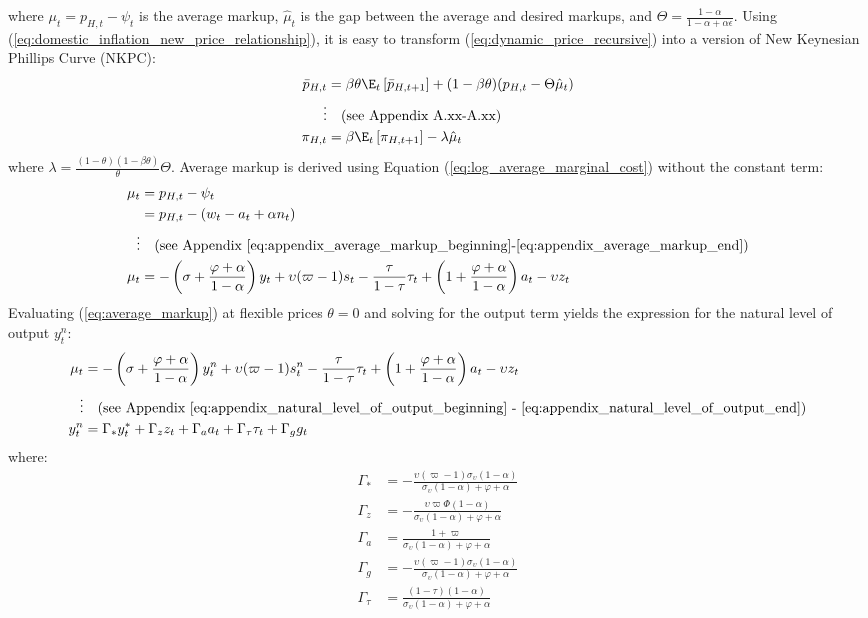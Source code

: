 where $\mu_t = p_{H,t} - \psi_t$ is the average markup, $\hat{\mu}_t$ is the gap between the average and desired markups, and $\Theta = \frac{1-\alpha}{1-\alpha + \alpha \epsilon}$. Using (\ref{eq:domestic_inflation_new_price_relationship}), it is easy to transform (\ref{eq:dynamic_price_recursive}) into a version of New Keynesian Phillips Curve (NKPC):
\begin{align}
    \bar{p}_{H,t} &= \beta \theta \E_t \left[ \bar{p}_{H,t+1} \right] + (1-\beta \theta)(p_{H,t} - \Theta \hat{\mu}_t) \\
    \vdots & \quad \text{(see Appendix A.xx-A.xx)} \nonumber \\
    \pi_{H,t} &= \beta \E_t \left[ \pi_{H,t+1}\right] - \lambda \hat{\mu}_t \label{eq:nkpc_a_version}
\end{align}
where $\lambda = \frac{(1-\theta)(1-\beta \theta)}{\theta}\Theta$. Average markup is derived using Equation (\ref{eq:log_average_marginal_cost}) without the constant term:
\begin{align}
    \mu_t &= p_{H,t} - \psi_t \\
     &= p_{H,t} - (w_t - a_t + \alpha n_t) \nonumber \\
    \vdots & \quad \text{(see Appendix \ref{eq:appendix_average_markup_beginning}-\ref{eq:appendix_average_markup_end})} \nonumber \\
    \mu_t &= -\left(\sigma + \frac{\varphi + \alpha}{1-\alpha}\right)y_t + \upsilon (\varpi - 1) s_t - \frac{\tau}{1-\tau}\tau_t  + \left(1 + \frac{\varphi + \alpha}{1-\alpha}\right)a_t - \upsilon z_t \label{eq:average_markup}
\end{align}
Evaluating (\ref{eq:average_markup}) at flexible prices $\theta=0$ and solving for the output term yields the expression for the natural level of output $y_t^n$:
\begin{align}
    \mu_t &= -\left(\sigma + \frac{\varphi + \alpha}{1-\alpha}\right)y^n_t + \upsilon (\varpi - 1) s^n_t - \frac{\tau}{1-\tau}\tau_t  + \left(1 + \frac{\varphi + \alpha}{1-\alpha}\right)a_t - \upsilon z_t \label{eq:average_markup_flexible_prices}\\
    \vdots & \quad \text{(see Appendix \ref{eq:appendix_natural_level_of_output_beginning} - \ref{eq:appendix_natural_level_of_output_end})} \nonumber \\
    y^n_t &= \Gamma_* y^*_t + \Gamma_z z_t + \Gamma_a a_t + \Gamma_\tau \tau_t + \Gamma_g g_t
\end{align}
where:
\begin{align}
    \Gamma_* &= -\frac{\upsilon(\varpi - 1)\sigma_\upsilon(1-\alpha)}{\sigma_\upsilon (1-\alpha) + \varphi + \alpha} \\
    \Gamma_z &= -\frac{\upsilon \varpi \Phi (1-\alpha)}{\sigma_\upsilon (1-\alpha) + \varphi + \alpha} \\
    \Gamma_a &= \frac{1+\varpi}{\sigma_\upsilon (1-\alpha) + \varphi + \alpha} \\
    \Gamma_g &= -\frac{\upsilon(\varpi - 1)\sigma_\upsilon(1-\alpha)}{\sigma_\upsilon (1-\alpha) + \varphi + \alpha}\\
    \Gamma_\tau &= \frac{(1-\tau)(1-\alpha)}{\sigma_\upsilon (1-\alpha) + \varphi + \alpha}
\end{align}
